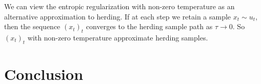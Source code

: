 \documentclass{article}
\begin{document}
We can view the entropic regularization
with non-zero temperature as an alternative approximation to herding. If at each step we
retain a sample $x_{t} \sim u_{t}$, then the sequence $(x_{t})_{t}$ converges to the 
herding sample path as $\tau \to 0$. So $(x_{t})_{t}$ with non-zero temperature approximate
herding samples. 

\section{Conclusion}
\label{sec:conclusion}

%
%
\end{document}
